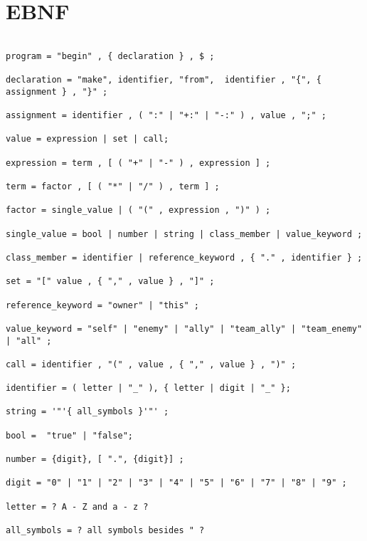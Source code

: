 \section{\langname{} EBNF}
\begin{comment}
Two criteria were used to support the design of our language syntax, these are writability and readability. Writability is a measure for how convenient, for a programmer, a language is to write and readability is a measure for how easy a language is to understand and learn. These two have an extreme on each side of the scale, where a complex language can be extremely efficient due to type security, the number of operations and data structures, on the other side a simple one, made to be easy to use and learn often sacrifices some of the type security, operations and data structures to be more convenient for the user.
\end{comment}
{\begin{lstlisting}[numbers=none]

program = "begin" , { declaration } , $ ;

declaration = "make", identifier, "from",  identifier , "{", { assignment } , "}" ;

assignment = identifier , ( ":" | "+:" | "-:" ) , value , ";" ;

value = expression | set | call;

expression = term , [ ( "+" | "-" ) , expression ] ;

term = factor , [ ( "*" | "/" ) , term ] ;

factor = single_value | ( "(" , expression , ")" ) ;

single_value = bool | number | string | class_member | value_keyword ;

class_member = identifier | reference_keyword , { "." , identifier } ;

set = "[" value , { "," , value } , "]" ;

reference_keyword = "owner" | "this" ;

value_keyword = "self" | "enemy" | "ally" | "team_ally" | "team_enemy" | "all" ;

call = identifier , "(" , value , { "," , value } , ")" ;

identifier = ( letter | "_" ), { letter | digit | "_" };

string = '"'{ all_symbols }'"' ;

bool =  "true" | "false";

number = {digit}, [ ".", {digit}] ;

digit = "0" | "1" | "2" | "3" | "4" | "5" | "6" | "7" | "8" | "9" ;

letter = ? A - Z and a - z ?

all_symbols = ? all symbols besides " ?

\end{lstlisting}}
